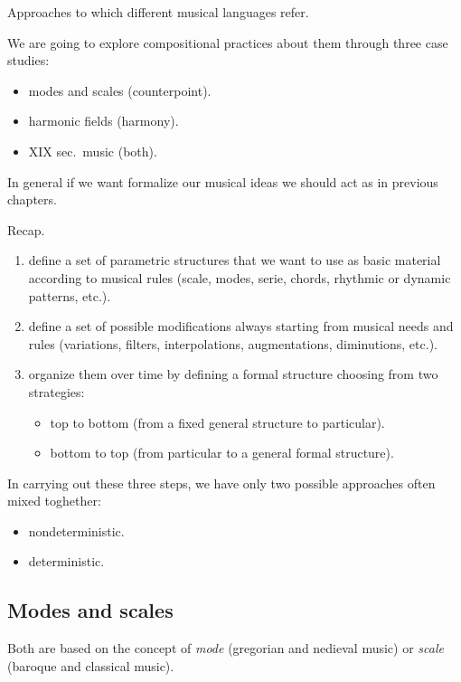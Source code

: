 Approaches to which different musical languages refer.

We are going to explore compositional practices about them through three case studies:

\begin{itemize}
\tightlist
\item modes and scales (counterpoint).
\item harmonic fields (harmony).
\item XIX sec.~music (both).
\end{itemize}

In general if we want formalize our musical ideas we should act as in previous chapters.

Recap.

\begin{enumerate}
\def\labelenumi{\arabic{enumi}.}
\tightlist
\item define a set of parametric structures that we want to use as basic material according to musical rules (scale, modes, serie, chords, rhythmic or dynamic patterns, etc.).
\item define a set of possible modifications always starting from musical needs and rules (variations, filters, interpolations, augmentations, diminutions, etc.).
\item organize them over time by defining a formal structure choosing from two strategies:
  \begin{itemize}
  \tightlist
  \item top to bottom (from a fixed general structure to particular).
  \item bottom to top (from particular to a general formal structure).
  \end{itemize}
\end{enumerate}

In carrying out these three steps, we have only two possible approaches often mixed toghether:

\begin{itemize}
\tightlist
\item nondeterministic.
\item deterministic.
\end{itemize}

\subsection{Modes and scales}\label{modes-and-scales}

Both are based on the concept of \textit{mode} (gregorian and nedieval music) or \textit{scale} (baroque and classical music).

